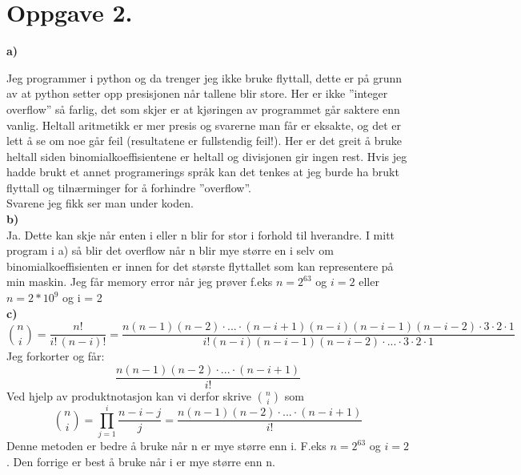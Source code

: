 \documentclass[,norsk]{article}
\begin{document}
\section{Oppgave 2.}
\textbf{a)}

Jeg programmer i python og da trenger jeg ikke bruke flyttall, dette
er på grunn av at python setter opp presisjonen når tallene blir
store. Her er ikke ''integer overflow'' så farlig, det som skjer er at
kjøringen av programmet går saktere enn vanlig. Heltall aritmetikk er
mer presis og svarerne man får er eksakte, og det er lett å se om noe
går feil (resultatene er fullstendig feil!). Her er det greit å bruke
heltall siden binomialkoeffisientene er heltall og divisjonen gir
ingen rest. Hvis jeg hadde brukt et annet programerings språk kan det tenkes
at jeg burde ha brukt flyttall og tilnærminger for å forhindre ''overflow''. \\
Svarene jeg fikk ser man under koden. \\
\textbf{b)}\\
Ja. Dette kan skje når enten i eller n blir for stor i forhold til
hverandre. I mitt program i a) så blir det overflow når n blir mye større en i
selv om binomialkoeffisienten er innen for det største flyttallet som
kan representere på min maskin. Jeg får memory error når jeg prøver
f.eks $n = 2^{63}$ og $i = 2$ eller $n = 2*10^9$ og i = 2 \\
\textbf{c)}\\
\begin{equation}\label{eq:binomdef}
\binom{n}{i}=\frac{n!}{i!\,(n-i)!}
=\frac{n(n-1)(n-2)\cdot...\cdot(n-i+1)(n-i)(n-i-1)(n-i-2)\cdot3\cdot2\cdot1}{i!
  (n-i)(n-i-1)(n-i-2)\cdot...\cdot3\cdot2\cdot1}
\end{equation}
Jeg forkorter og får:
\begin{equation}\label{eq:binomdef}
\frac{n(n-1)(n-2)\cdot...\cdot(n-i+1)}{i!}
\end{equation}
Ved hjelp av produktnotasjon kan vi derfor skrive $\binom{n}{i}$ som
\begin{equation}\label{eq:altdef}
\binom{n}{i}=\prod_{j=1}^{i} \frac{n-i-j}{j} = \frac{n(n-1)(n-2)\cdot...\cdot(n-i+1)}{i!}
\end{equation}
Denne metoden er bedre å bruke når n er mye større enn i. F.eks $n = 2^{63}$ og $i = 2$
. Den forrige er best å bruke når i er mye større enn n.
\end{document}
